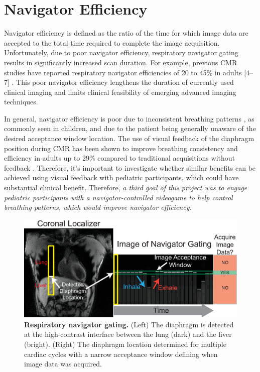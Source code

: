 \section{Navigator Efficiency}
	Navigator efficiency is defined as the ratio of the time for which image data are accepted to the total time required to complete the image acquisition. Unfortunately, due to poor navigator efficiency, respiratory navigator gating results in significantly increased scan duration. For example, previous CMR studies have reported respiratory navigator efficiencies of 20 to 45\% in adults [4–7] \cite{Abd-Elmoniem2011,Feuerlein2009,Jhooti2011,Wang1996}. This poor navigator efficiency lengthens the duration of currently used clinical imaging and limits clinical feasibility of emerging advanced imaging techniques.
	
	In general, navigator efficiency is poor due to inconsistent breathing patterns \cite{Liu1993,Wang1995a,Taylor1997a}, as commonly seen in children, and due to the patient being generally unaware of the desired acceptance window location. The use of visual feedback of the diaphragm position during CMR has been shown to improve breathing consistency and efficiency in adults up to 29\% compared to traditional acquisitions without feedback \cite{Feuerlein2009,Jhooti2011}. Therefore, it's important to investigate whether similar benefits can be achieved using visual feedback with pediatric participants, which could have substantial clinical benefit. Therefore, \textit{a third goal of this project was to engage pediatric participants with a navigator-controlled videogame to help control breathing patterns, which would improve navigator efficiency.}
	
	\begin{figure}
		\centering
		\includegraphics{figures/intro/navigator_gating_explanation}
		\caption[Respiratory navigator gating]{\textbf{Respiratory navigator gating.} (Left) The diaphragm is detected at the high-contrast interface between the lung (dark) and the liver (bright). (Right) The diaphragm location determined for multiple cardiac cycles with a narrow acceptance window	defining when image data was acquired.}
		\label{fig:navigator_gating_explanation}
	\end{figure}

